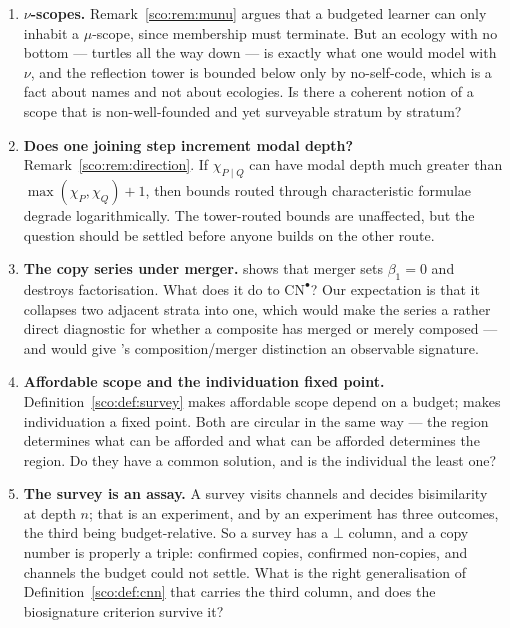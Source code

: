 \documentclass[11pt]{article}
\theoremstyle{plain}
\theoremstyle{definition}
\theoremstyle{remark}
\newcommand{\CN}{\mathrm{CN}}
\newcommand{\bt}{\beta_1}
\begin{document}
\begin{enumerate}[leftmargin=*,itemsep=5pt]

\item \textbf{$\nu$-scopes.} Remark~\ref{sco:rem:munu} argues that a
budgeted learner can only inhabit a $\mu$-scope, since membership must
terminate. But an ecology with no bottom --- turtles all the way down ---
is exactly what one would model with $\nu$, and the reflection tower is
bounded below only by no-self-code, which is a fact about names and not
about ecologies. Is there a coherent notion of a scope that is
non-well-founded and yet surveyable stratum by stratum?

\item \textbf{Does one joining step increment modal depth?}
Remark~\ref{sco:rem:direction}. If $\chi_{P\mid Q}$ can have modal depth
much greater than $\max(\chi_P, \chi_Q) + 1$, then bounds routed through
characteristic formulae degrade logarithmically. The tower-routed bounds
are unaffected, but the question should be settled before anyone builds on
the other route.

\item \textbf{The copy series under merger.} \cite[\S8]{engine} shows that
merger sets $\bt = 0$ and destroys factorisation. What does it do to
$\CN^{\bullet}$? Our expectation is that it collapses two adjacent strata
into one, which would make the series a rather direct diagnostic for
whether a composite has merged or merely composed --- and would give
\cite{compose}'s composition/merger distinction an observable signature.

\item \textbf{Affordable scope and the individuation fixed point.}
Definition~\ref{sco:def:survey} makes affordable scope depend on a budget;
\cite[Rem.~5.24]{engine} makes individuation a fixed point. Both are
circular in the same way --- the region determines what can be afforded and
what can be afforded determines the region. Do they have a common solution,
and is the individual the least one?

\item \textbf{The survey is an assay.} A survey visits channels and
decides bisimilarity at depth $n$; that is an experiment, and by
\cite[\S4]{scientist} an experiment has three outcomes, the third being
budget-relative. So a survey has a $\bot$ column, and a copy number is
properly a triple: confirmed copies, confirmed non-copies, and channels
the budget could not settle. What is the right generalisation of
Definition~\ref{sco:def:cnn} that carries the third column, and does the
biosignature criterion survive it?


\end{enumerate}
\end{document}
